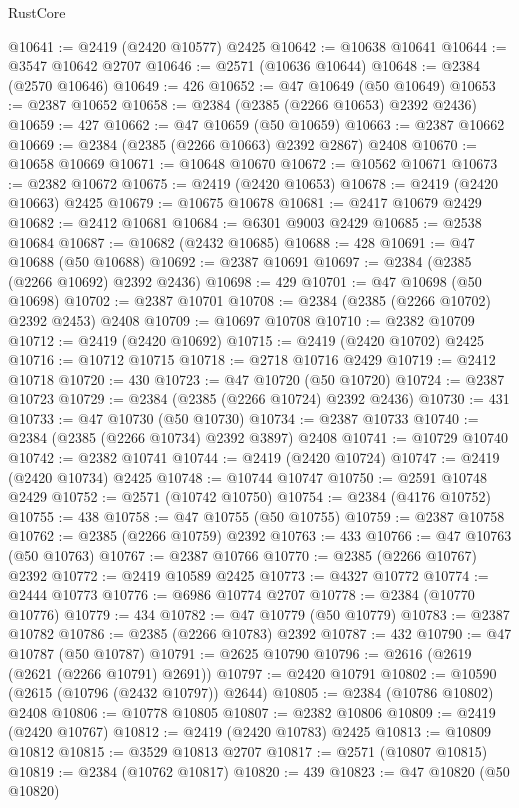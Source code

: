 \begin{lexlean}{RustCore}
\begin{coremodule}
@10641 := @2419 (@2420 @10577) @2425
@10642 := @10638 @10641
@10644 := @3547 @10642 @2707
@10646 := @2571 (@10636 @10644)
@10648 := @2384 (@2570 @10646)
@10649 := 426
@10652 := @47 @10649 (@50 @10649)
@10653 := @2387 @10652
@10658 := @2384 (@2385 (@2266 @10653) @2392 @2436)
@10659 := 427
@10662 := @47 @10659 (@50 @10659)
@10663 := @2387 @10662
@10669 := @2384 (@2385 (@2266 @10663) @2392 @2867) @2408
@10670 := @10658 @10669
@10671 := @10648 @10670
@10672 := @10562 @10671
@10673 := @2382 @10672
@10675 := @2419 (@2420 @10653)
@10678 := @2419 (@2420 @10663) @2425
@10679 := @10675 @10678
@10681 := @2417 @10679 @2429
@10682 := @2412 @10681
@10684 := @6301 @9003 @2429
@10685 := @2538 @10684
@10687 := @10682 (@2432 @10685)
@10688 := 428
@10691 := @47 @10688 (@50 @10688)
@10692 := @2387 @10691
@10697 := @2384 (@2385 (@2266 @10692) @2392 @2436)
@10698 := 429
@10701 := @47 @10698 (@50 @10698)
@10702 := @2387 @10701
@10708 := @2384 (@2385 (@2266 @10702) @2392 @2453) @2408
@10709 := @10697 @10708
@10710 := @2382 @10709
@10712 := @2419 (@2420 @10692)
@10715 := @2419 (@2420 @10702) @2425
@10716 := @10712 @10715
@10718 := @2718 @10716 @2429
@10719 := @2412 @10718
@10720 := 430
@10723 := @47 @10720 (@50 @10720)
@10724 := @2387 @10723
@10729 := @2384 (@2385 (@2266 @10724) @2392 @2436)
@10730 := 431
@10733 := @47 @10730 (@50 @10730)
@10734 := @2387 @10733
@10740 := @2384 (@2385 (@2266 @10734) @2392 @3897) @2408
@10741 := @10729 @10740
@10742 := @2382 @10741
@10744 := @2419 (@2420 @10724)
@10747 := @2419 (@2420 @10734) @2425
@10748 := @10744 @10747
@10750 := @2591 @10748 @2429
@10752 := @2571 (@10742 @10750)
@10754 := @2384 (@4176 @10752)
@10755 := 438
@10758 := @47 @10755 (@50 @10755)
@10759 := @2387 @10758
@10762 := @2385 (@2266 @10759) @2392
@10763 := 433
@10766 := @47 @10763 (@50 @10763)
@10767 := @2387 @10766
@10770 := @2385 (@2266 @10767) @2392
@10772 := @2419 @10589 @2425
@10773 := @4327 @10772
@10774 := @2444 @10773
@10776 := @6986 @10774 @2707
@10778 := @2384 (@10770 @10776)
@10779 := 434
@10782 := @47 @10779 (@50 @10779)
@10783 := @2387 @10782
@10786 := @2385 (@2266 @10783) @2392
@10787 := 432
@10790 := @47 @10787 (@50 @10787)
@10791 := @2625 @10790
@10796 := @2616 (@2619 (@2621 (@2266 @10791) @2691))
@10797 := @2420 @10791
@10802 := @10590 (@2615 (@10796 (@2432 @10797)) @2644)
@10805 := @2384 (@10786 @10802) @2408
@10806 := @10778 @10805
@10807 := @2382 @10806
@10809 := @2419 (@2420 @10767)
@10812 := @2419 (@2420 @10783) @2425
@10813 := @10809 @10812
@10815 := @3529 @10813 @2707
@10817 := @2571 (@10807 @10815)
@10819 := @2384 (@10762 @10817)
@10820 := 439
@10823 := @47 @10820 (@50 @10820)

\end{coremodule}
\end{lexlean}
